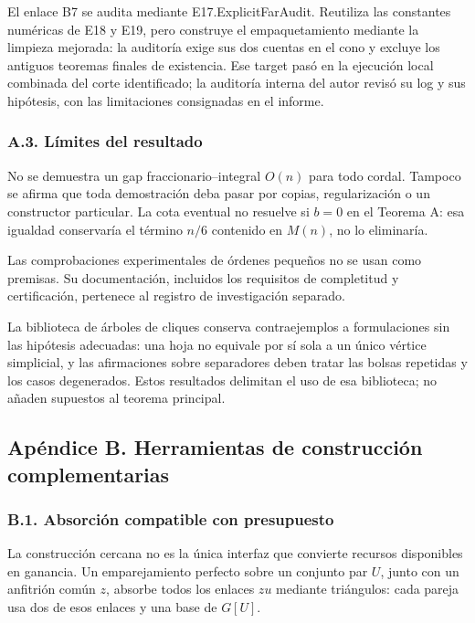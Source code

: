 \documentclass[spanish,11pt,a4paper]{article}
\begin{document}
El enlace B7 se audita mediante {\ttfamily\small E17.\discretionary{\hbox{\ensuremath{\hookrightarrow}}}{}{}ExplicitFarA\discretionary{\hbox{\ensuremath{\hookrightarrow}}}{}{}udit}. Reutiliza las constantes numéricas de {\ttfamily\small E18} y {\ttfamily\small E19}, pero construye el empaquetamiento mediante la limpieza mejorada: la auditoría exige sus dos cuentas en el cono y excluye los antiguos teoremas finales de existencia. Ese target pasó en la ejecución local combinada del corte identificado; la auditoría interna del autor revisó su log y sus hipótesis, con las limitaciones consignadas en el informe.

\subsubsection{A.3. Límites del resultado}\label{a.3.-limites-del-resultado}

No se demuestra un gap fraccionario--integral \(O(n)\) para todo cordal. Tampoco se afirma que toda demostración deba pasar por copias, regularización o un constructor particular. La cota eventual no resuelve si \(b=0\) en el Teorema A: esa igualdad conservaría el término \(n/6\) contenido en \(M(n)\), no lo eliminaría.

Las comprobaciones experimentales de órdenes pequeños no se usan como premisas. Su documentación, incluidos los requisitos de completitud y certificación, pertenece al registro de investigación separado.

La biblioteca de árboles de cliques conserva contraejemplos a formulaciones sin las hipótesis adecuadas: una hoja no equivale por sí sola a un único vértice simplicial, y las afirmaciones sobre separadores deben tratar las bolsas repetidas y los casos degenerados. Estos resultados delimitan el uso de esa biblioteca; no añaden supuestos al teorema principal.

\subsection{Apéndice B. Herramientas de construcción complementarias}\label{apendice-b.-herramientas-de-construccion-complementarias}

\subsubsection{B.1. Absorción compatible con presupuesto}\label{b.1.-absorcion-compatible-con-presupuesto}

La construcción cercana no es la única interfaz que convierte recursos disponibles en ganancia. Un emparejamiento perfecto sobre un conjunto par \(U\), junto con un anfitrión común \(z\), absorbe todos los enlaces \(zu\) mediante triángulos: cada pareja usa dos de esos enlaces y una base de \(G[U]\).
\end{document}
